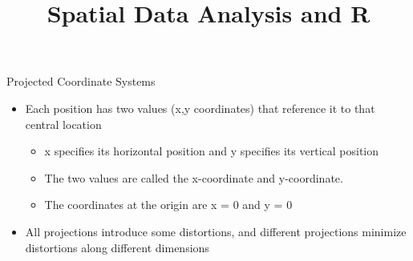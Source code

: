 \documentclass[hyperref={pdfpagelabels=false}]{beamer}
\begin{document}
\begin{frame}{Projected Coordinate Systems}
\begin{itemize}
	
	\item Each position has two values (x,y coordinates) that reference it to that central location
	\vspace{0.2cm}
	\begin{itemize}
		\item x specifies its horizontal position and y specifies its vertical position
		\vspace{0.2cm}
		\item The two values are called the x-coordinate and y-coordinate. 
		\vspace{0.2cm}
		\item The coordinates at the origin are x = 0 and y = 0
	\end{itemize}
	\vspace{0.2cm}
	\item All projections introduce some distortions, and different projections minimize distortions along different dimensions
	
\end{itemize}
\end{frame}





\title[]  
{Spatial Data Analysis and R}


\author 
{}

\institute{}
\end{document}
